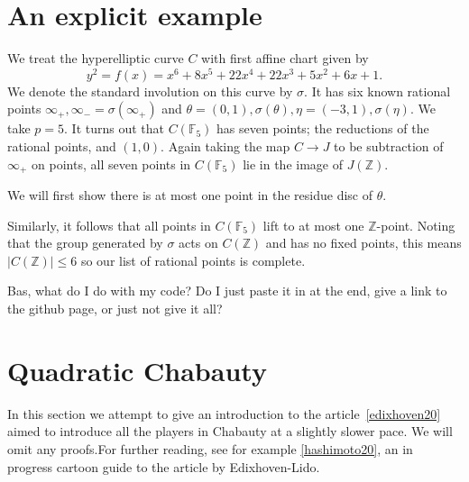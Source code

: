 \documentclass[12pt]{article}
\newcommand{\Z}{\mathbb{Z}}
\newcommand{\F}{\mathbb{F}}
\theoremstyle{plain}
\theoremstyle{definition}
\theoremstyle{remark}
\begin{document}
\section{An explicit example}
\label{section:example}
We treat the hyperelliptic curve $C$ with first affine chart given by
\[
y^2 = f(x) = x^6+ 8x^5+ 22x^4+ 22x^3+ 5x^2+ 6x+ 1.
\]
We denote the standard involution on this curve by $\sigma$. It has six known rational points $\infty_+,\infty_- = \sigma(\infty_+)$ and $\theta = (0,1),\sigma(\theta),\eta=(-3,1),\sigma(\eta)$. We take $p = 5$. It turns out that $C(\F_5)$ has seven points; the reductions of the rational points, and $(1,0)$. Again taking the map $C \to J$ to be subtraction of $\infty_+$ on points, all seven points in $C(\F_5)$ lie in the image of $J(\Z)$.

We will first show there is at most one point in the residue disc of $\theta$. 

Similarly, it follows that all points in $C(\F_5)$ lift to at most one $\Z$-point. Noting that the group generated by $\sigma$ acts on $C(\Z)$ and has no fixed points, this means $|C(\Z)| \leq 6$ so our list of rational points is complete.

Bas, what do I do with my code? Do I just paste it in at the end, give a link to the github page, or just not give it all?

\section{Quadratic Chabauty}
In this section we attempt to give an introduction to the article~\ref{edixhoven20} aimed to introduce all the players in Chabauty at a slightly slower pace. We will omit any proofs.For further reading, see for example \ref{hashimoto20}, an in progress cartoon guide to the article by Edixhoven-Lido.
\end{document}
